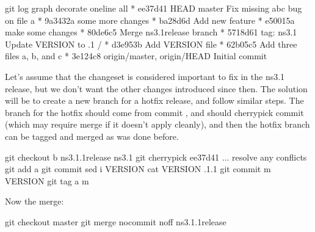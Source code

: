 \documentclass[letterpaper,10pt,english]{sphinxmanual}
\renewcommand{\sphinxcode}[1]{\texttt{\small{#1}}}
\begin{document}
\begin{sphinxVerbatim}[commandchars=\\\{\}]
\PYGZdl{} git log \PYGZhy{}\PYGZhy{}graph \PYGZhy{}\PYGZhy{}decorate \PYGZhy{}\PYGZhy{}oneline \PYGZhy{}\PYGZhy{}all
* ee37d41 HEAD \PYGZhy{}\PYGZgt{} master Fix missing abc bug on file a
* 9a3432a some more changes
* ba28d6d Add new feature
* e50015a make some changes
*   80de6c5 Merge ns\PYGZhy{}3.1\PYGZhy{}release branch
 * 5718d61 tag: ns\PYGZhy{}3.1 Update VERSION to .1
/
* d3e953b Add VERSION file
* 62b05c5 Add three files a, b, and c
* 3e124c8 origin/master, origin/HEAD Initial commit
\end{sphinxVerbatim}

Let’s assume that the changeset \sphinxcode{} is considered important to fix in
the ns\sphinxhyphen{}3.1 release, but we don’t want the other changes introduced since then.
The solution will be to create a new branch for a hotfix release, and follow
similar steps.  The branch for the hotfix should come from commit \sphinxcode{},
and should cherry\sphinxhyphen{}pick commit \sphinxcode{} (which may require merge if it
doesn’t apply cleanly), and then the hotfix branch can be tagged and merged
as was done before.

\begin{sphinxVerbatim}[commandchars=\\\{\}]
\PYGZdl{} git checkout \PYGZhy{}b ns\PYGZhy{}3.1.1\PYGZhy{}release ns\PYGZhy{}3.1
\PYGZdl{} git cherry\PYGZhy{}pick ee37d41
... resolve any conflicts
\PYGZdl{} git add a
\PYGZdl{} git commit
\PYGZdl{} sed \PYGZhy{}i  VERSION
\PYGZdl{} cat VERSION
.1.1
\PYGZdl{} git commit \PYGZhy{}m VERSION
\PYGZdl{} git tag \PYGZhy{}a  \PYGZhy{}m
\end{sphinxVerbatim}

Now the merge:

\begin{sphinxVerbatim}[commandchars=\\\{\}]
\PYGZdl{} git checkout master
\PYGZdl{} git merge \PYGZhy{}\PYGZhy{}no\PYGZhy{}commit \PYGZhy{}\PYGZhy{}no\PYGZhy{}ff ns\PYGZhy{}3.1.1\PYGZhy{}release
\end{sphinxVerbatim}
\end{document}
